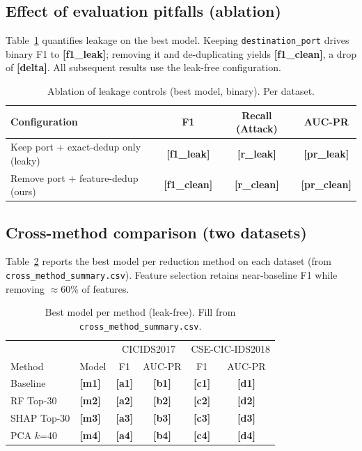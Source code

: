 \documentclass[runningheads]{llncs}
\newcommand{\ph}[1]{{\color{red}\textbf{[#1]}}}
\begin{document}
\subsection{Effect of evaluation pitfalls (ablation)}
Table~\ref{tab:ablation} quantifies leakage on the best model. Keeping \texttt{destination\_port} drives binary F1 to \ph{f1\_leak}; removing it and de-duplicating yields \ph{f1\_clean}, a drop of \ph{delta}. All subsequent results use the leak-free configuration.

\begin{table}[htbp]
  \caption{Ablation of leakage controls (best model, binary). Per dataset.}
  \label{tab:ablation}
  \centering\small
  \begin{tabular}{lccc}
    \toprule Configuration & F1 & Recall (Attack) & AUC-PR \\ \midrule
    Keep port + exact-dedup only (leaky) & \ph{f1\_leak} & \ph{r\_leak} & \ph{pr\_leak} \\
    Remove port + feature-dedup (ours) & \ph{f1\_clean} & \ph{r\_clean} & \ph{pr\_clean} \\
    \bottomrule
  \end{tabular}
\end{table}

\subsection{Cross-method comparison (two datasets)}
Table~\ref{tab:cross} reports the best model per reduction method on each dataset (from \texttt{cross\_method\_summary.csv}). Feature selection retains near-baseline F1 while removing $\approx$60\% of features.

\begin{table}[htbp]
  \caption{Best model per method (leak-free). Fill from \texttt{cross\_method\_summary.csv}.}
  \label{tab:cross}
  \centering\small
  \begin{tabular}{llcc|cc}
    \toprule
    & & \multicolumn{2}{c|}{CICIDS2017} & \multicolumn{2}{c}{CSE-CIC-IDS2018} \\
    Method & Model & F1 & AUC-PR & F1 & AUC-PR \\ \midrule
    Baseline    & \ph{m1} & \ph{a1} & \ph{b1} & \ph{c1} & \ph{d1} \\
    RF Top-30   & \ph{m2} & \ph{a2} & \ph{b2} & \ph{c2} & \ph{d2} \\
    SHAP Top-30 & \ph{m3} & \ph{a3} & \ph{b3} & \ph{c3} & \ph{d3} \\
    PCA $k$=40  & \ph{m4} & \ph{a4} & \ph{b4} & \ph{c4} & \ph{d4} \\
    \bottomrule
  \end{tabular}
\end{table}
\end{document}
